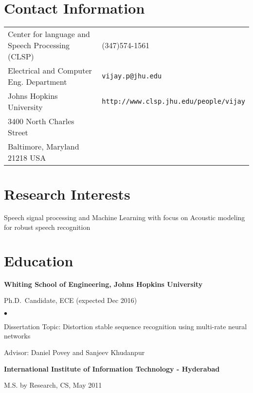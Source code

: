 \documentclass[margin,line,pifont,palatino,courier]{res}
\newenvironment{list1}{
  \begin{list}{\ding{113}}{%
      \setlength{\itemsep}{0in}
      \setlength{\parsep}{0in} \setlength{\parskip}{0in}
      \setlength{\topsep}{0in} \setlength{\partopsep}{0in}
      \setlength{\leftmargin}{0.17in}}}{\end{list}}
\newenvironment{list2}{
  \begin{list}{$\bullet$}{%
      \setlength{\itemsep}{0in}
      \setlength{\parsep}{0in} \setlength{\parskip}{0in}
      \setlength{\topsep}{0in} \setlength{\partopsep}{0in}
      \setlength{\leftmargin}{0.2in}}}{\end{list}}
\begin{document}

\begin{resume}

\section{\sc Contact Information}

\vspace{.05in}
\begin{tabular}{@{}p{2.75in}p{2in}}
Center for language and Speech Processing (CLSP) & (347)574-1561 \\
Electrical and Computer Eng. Department                        & \verb+vijay.p@jhu.edu+\\
Johns Hopkins University                  & \verb+http://www.clsp.jhu.edu/people/vijay+\\
3400 North Charles Street               & \\
Baltimore, Maryland 21218 USA               & \\
\end{tabular}

\section{\sc Research Interests}
Speech signal processing and Machine Learning with focus on Acoustic modeling for robust speech recognition
\section{\sc Education}

{\bf Whiting School of Engineering, Johns Hopkins University}\\
\vspace*{-.1in}
\begin{list1}
\item[] Ph.D.~Candidate, ECE (expected Dec 2016)

\begin{list2}
\vspace*{.05in}
\item Dissertation Topic:  Distortion stable sequence recognition using multi-rate neural networks
\item Advisor: Daniel Povey and Sanjeev Khudanpur
\end{list2}
\end{list1}

{\bf International Institute of Information Technology - Hyderabad}\\
\vspace*{-.1in}
\begin{list1}
\item[] M.S. by Research, CS, May 2011


\end{list1}
\end{resume}
\end{document}
